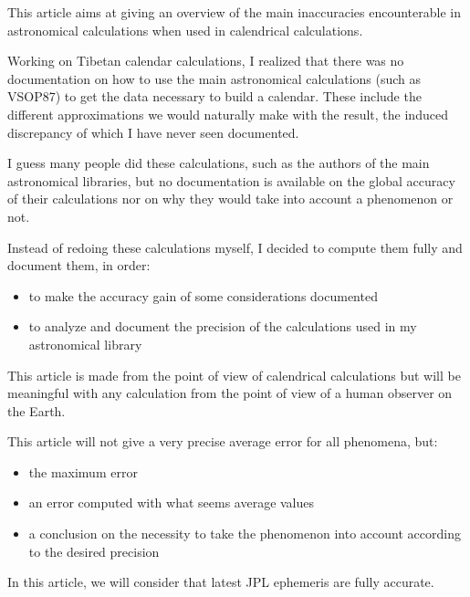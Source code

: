 

This article aims at giving an overview of the main inaccuracies encounterable in astronomical calculations when used in calendrical calculations.


Working on Tibetan calendar calculations, I realized that there was no documentation on how to use the main astronomical calculations (such as VSOP87) to get the data necessary to build a calendar. These include the different approximations we would naturally make with the result, the induced discrepancy of which I have never seen documented.

I guess many people did these calculations, such as the authors of the main astronomical libraries, but no documentation is available on the global accuracy of their calculations nor on why they would take into account a phenomenon or not.

Instead of redoing these calculations myself, I decided to compute them fully and document them, in order:
\begin{itemize}
\item to make the accuracy gain of some considerations documented
\item to analyze and document the precision of the calculations used in my astronomical library\TODO
\end{itemize}

This article is made from the point of view of calendrical calculations but will be meaningful with any calculation from the point of view of a human observer on the Earth.

This article will not give a very precise average error for all phenomena, but:
\begin{itemize}
\item the maximum error
\item an error computed with what seems average values
\item a conclusion on the necessity to take the phenomenon into account according to the desired precision
\end{itemize}





In this article, we will consider that latest JPL ephemeris \TODO are fully accurate. 

